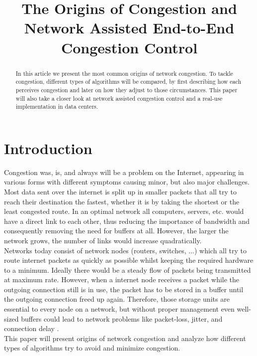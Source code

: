 \documentclass[a4paper,conference]{IEEEtran}
\begin{document}
\title{The Origins of Congestion and\\Network Assisted End-to-End Congestion Control}




\maketitle
\IEEEpeerreviewmaketitle

\begin{abstract}
In this article we present the most common origins of network congestion. To tackle congestion, different types of algorithms will be compared, by first describing how each perceives congestion and later on how they adjust to those circumstances. This paper will also take a closer look at network assisted congestion control and a real-use implementation in data centers.
\end{abstract}

\section{Introduction}
Congestion was, is, and always will be a problem on the Internet, appearing in various forms with different symptoms causing minor, but also major challenges. Most data sent over the internet is split up in smaller packets that all try to reach their destination the fastest, whether it is by taking the shortest or the least congested route. In an optimal network all computers, servers, etc. would have a direct link to each other, thus reducing the importance of bandwidth and  consequently removing the need for buffers at all. However, the larger the network grows, the number of links would increase quadratically.
\\Networks today consist of network nodes (routers, switches, ...) which all try to route internet packets as quickly as possible whilst keeping the required hardware to a minimum. Ideally there would be a steady flow of packets being transmitted at maximum rate. However, when a internet node receives a packet while the outgoing connection still is in use, the packet has to be stored in a buffer until the outgoing connection freed up again. Therefore, those storage units are essential to every node on a network, but without proper management even well-sized buffers could lead to network problems like packet-loss, jitter, and connection delay \cite{appenzeller2004sizing}.
\\This paper will present origins of network congestion and analyze how different types of algorithms try to avoid and minimize congestion.
\end{document}
